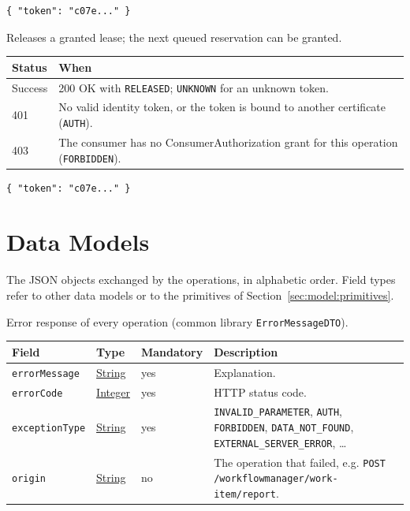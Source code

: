 \documentclass[a4paper]{arrowhead}
\newcommand{\pref}[1]{{\textcolor{ArrowheadGrey}{\hyperref[sec:model:primitives:#1]{#1}}}}
\begin{document}
\begin{lstlisting}[caption={Example request body}]
{ "token": "c07e..." }
\end{lstlisting}

Releases a granted lease; the next queued reservation can be granted.

{\small
\begin{longtable}{|p{2.0cm}|p{13.8cm}|}

\hline
\rowcolor{gray!33} Status & When \\ \hline
\endhead
Success & 200 OK with \texttt{RELEASED}; \texttt{UNKNOWN} for an unknown token. \\ \hline
401 & No valid identity token, or the token is bound to another certificate (\texttt{AUTH}). \\ \hline
403 & The consumer has no ConsumerAuthorization grant for this operation (\texttt{FORBIDDEN}). \\ \hline
\end{longtable}
}


\begin{lstlisting}[caption={Example request body}]
{ "token": "c07e..." }
\end{lstlisting}


\newpage
\section{Data Models}
\label{sec:model}
The JSON objects exchanged by the operations, in alphabetic order. Field types refer to other data models or to the
primitives of Section~\ref{sec:model:primitives}.

Error response of every operation (common library \texttt{Error\allowbreak{}MessageDTO}).

{\small
\begin{longtable}{|p{3.7cm}|p{4.2cm}|p{1.6cm}|p{6.3cm}|}

\hline
\rowcolor{gray!33} Field & Type & Mandatory & Description \\ \hline
\endhead
\texttt{errorMessage} & \pref{String} & yes & Explanation. \\ \hline
\texttt{errorCode} & \pref{Integer} & yes & HTTP status code. \\ \hline
\texttt{exceptionType} & \pref{String} & yes & \texttt{INVALID\_\allowbreak{}PARAMETER}, \texttt{AUTH}, \texttt{FORBIDDEN}, \texttt{DATA\_\allowbreak{}NOT\_\allowbreak{}FOUND}, \texttt{EXTERNAL\_\allowbreak{}SERVER\_\allowbreak{}ERROR}, \ldots \\ \hline
\texttt{origin} & \pref{String} & no & The operation that failed, e.g. \texttt{POST /\allowbreak{}workflowmanager/\allowbreak{}work-\allowbreak{}item/\allowbreak{}report}. \\ \hline
\end{longtable}
}
\end{document}
